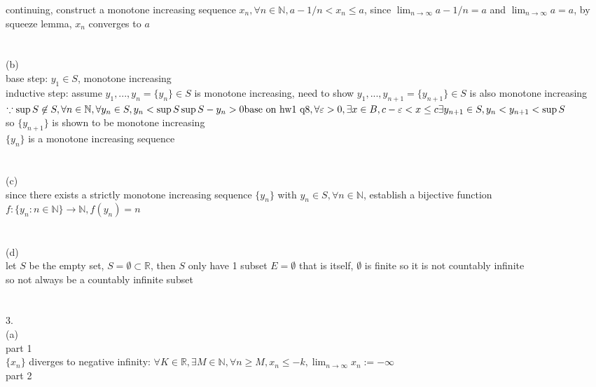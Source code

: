 \documentclass[12pt, border = 4pt, multi]{article} %
\begin{document}
continuing, construct a monotone increasing sequence $x_n, \forall n \in \mathbb{N}, a - 1 / n < x_n \leq a$, since $\lim_{n \rightarrow \infty} a - 1 / n = a$ and $\lim_{n \rightarrow \infty} a = a$, by squeeze lemma, $x_n$ converges to $a$\\
\\
\\
(b)\\
base step: $y_1 \in S$, monotone increasing\\
inductive step: assume $y_1, ..., y_n = \{y_n\} \in S$ is monotone increasing, need to show $y_1, ..., y_{n + 1} = \{y_{n + 1}\} \in S$ is also monotone increasing\\
$\because \sup S \not\in S, \forall n \in \mathbb{N}, \forall y_n \in S, y_n < \sup S \\
\sup S - y_n > 0\\
\text{base on hw1 q8}, \forall \varepsilon > 0, \exists x \in B, c - \varepsilon < x \leq c\\
\exists y_{n + 1} \in S, y_n < y_{n + 1} < \sup S$\\
so $\{y_{n + 1}\}$ is shown to be monotone increasing\\
$\{y_n\}$ is a monotone increasing sequence\\
\\
\\
(c)\\
since there exists a strictly monotone increasing sequence $\{y_n\}$ with $y_n \in S, \forall n \in \mathbb{N}$, establish a bijective function $f: \{y_n : n \in \mathbb{N}\} \rightarrow \mathbb{N}, f(y_n) = n$\\
\\
\\
(d)\\
let $S$ be the empty set, $S = \emptyset \subset \mathbb{R}$, then $S$ only have 1 subset $E = \emptyset$ that is itself, $\emptyset$ is finite so it is not countably infinite\\
so not always be a countably infinite subset\\
\\
\\
3.\\
(a)\\
part 1\\
$\{x_n\}$ diverges to negative infinity: $\forall K \in \mathbb{R}, \exists M \in \mathbb{N}, \forall n \geq M, x_n \leq -k, \lim_{n \rightarrow \infty} x_n := -\infty$\\
part 2\\
\end{document}
